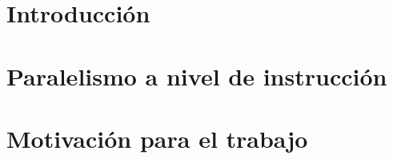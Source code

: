 
\section{Introducción}
\label{1:sec:1}



\section{Paralelismo a nivel de instrucción}
\label{1:sec:2}


\section{Motivación para el trabajo}
\label{1:sec:3}


